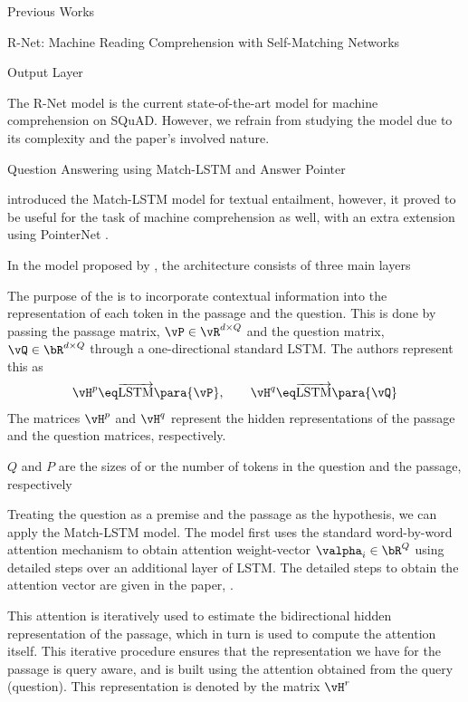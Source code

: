 \documentclass{article}
\begin{document}
\begin{psection}{Previous Works}
\begin{psubsection}{R-Net: Machine Reading Comprehension with Self-Matching Networks}
\begin{subsubsection}{Output Layer}
		\end{subsubsection}

		\sloppy
		The R-Net model is the current state-of-the-art model for machine comprehension on SQuAD. However, we refrain from studying the model due to its complexity and the paper's involved nature.

	\end{psubsection}

	\begin{psubsection}{Question Answering using Match-LSTM and Answer Pointer}

		\cite{match-lstm-mc} introduced the Match-LSTM \citep{match-lstm} model for textual entailment, however, it proved to be useful for the task of machine comprehension as well, with an extra extension using PointerNet \citep{pointernet}.

		In the model proposed by , the architecture consists of three main layers
		\begin{enumerate}[label=\bt{\theenumi.}]
				The purpose of the  is to incorporate contextual information into the representation of each token in the passage and the question.
				This is done by passing the passage matrix, $\vP \in \vR^{d \times Q}$ and the question matrix, $\vQ \in \bR^{d \times Q}$ through a one-directional standard LSTM.
				The authors represent this as
				\begin{align*}
					\vH^p	\eq	\overrightarrow{\text{LSTM}}\para{\vP}, \quad\quad
					\vH^q	\eq	\overrightarrow{\text{LSTM}}\para{\vQ}
				\end{align*}
				The matrices $\vH^p$ and $\vH^q$ represent the hidden representations of the passage and the question matrices, respectively.

				\begin{note}
					$Q$ and $P$ are the sizes of or the number of tokens in the question and the passage, respectively
				\end{note}

				Treating the question as a premise and the passage as the hypothesis, we can apply the Match-LSTM model.
				The model first uses the standard word-by-word attention mechanism to obtain attention weight-vector $\valpha_i \in \bR^Q$ using detailed steps over an additional layer of LSTM. The detailed steps to obtain the attention vector are given in the paper, \cite{match-lstm-mc}.

				This attention is iteratively used to estimate the bidirectional hidden representation of the passage, which in turn is used to compute the attention itself.
				This iterative procedure ensures that the representation we have for the passage is query aware, and is built using the attention obtained from the query (question).
				This representation is denoted by the matrix $\vH^r$


\end{enumerate}
\end{psubsection}
\end{psection}
\end{document}
